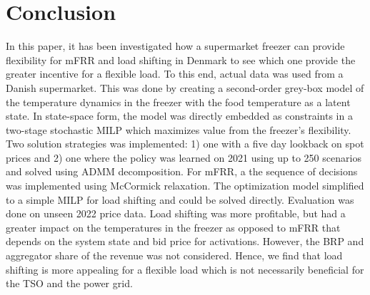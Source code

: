 \section{Conclusion}\label{sec:conclusion}

In this paper, it has been investigated how a supermarket freezer can provide flexibility for mFRR and load shifting in Denmark to see which one provide the greater incentive for a flexible load. To this end, actual data was used from a Danish supermarket. This was done by creating a second-order grey-box model of the temperature dynamics in the freezer with the food temperature as a latent state. In state-space form, the model was directly embedded as constraints in a two-stage stochastic MILP which maximizes value from the freezer's flexibility. Two solution strategies was implemented: 1) one with a five day lookback on spot prices and 2) one where the policy was learned on 2021 using up to 250 scenarios and solved using ADMM decomposition. For mFRR, a the sequence of decisions was implemented using McCormick relaxation. The optimization model simplified to a simple MILP for load shifting and could be solved directly. Evaluation was done on unseen 2022 price data. Load shifting was more profitable, but had a greater impact on the temperatures in the freezer as opposed to mFRR that depends on the system state and bid price for activations. However, the BRP and aggregator share of the revenue was not considered. Hence, we find that load shifting is more appealing for a flexible load which is not necessarily beneficial for the TSO and the power grid.
